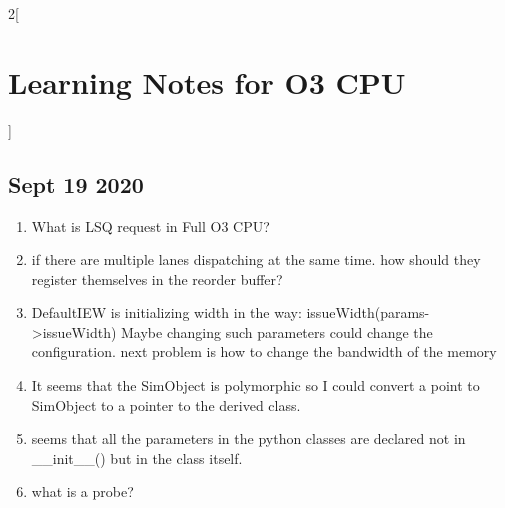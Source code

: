 \documentclass[11pt]{article}
\begin{document}
\begin{multicols}{2}[\section{Learning Notes for O3 CPU}]
\subsection{Sept 19 2020}
\begin{enumerate}
  \item What is LSQ request in Full O3 CPU?
  \item if there are multiple lanes dispatching at the same time. how should they register themselves in the reorder buffer?
  \item DefaultIEW is initializing width in the way: issueWidth(params-\textgreater issueWidth) Maybe changing such parameters could change the configuration. next problem is how to change the bandwidth of the memory
  \item It seems that the SimObject is polymorphic so I could convert a point to SimObject to a pointer to the derived class.
  \item seems that all the parameters in the python classes are declared not in \_\_init\_\_() but in the class itself.
  \item what is a probe?
\end{enumerate}
\end{multicols}
\end{document}
